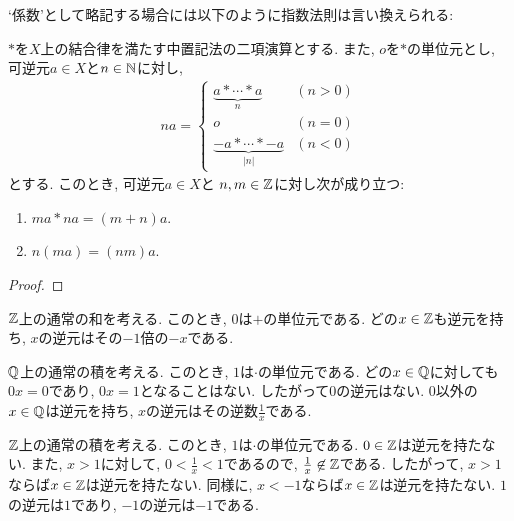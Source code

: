 `係数'として略記する場合には以下のように指数法則は言い換えられる:
\begin{prop}
  $\ast$を$X$上の結合律を満たす中置記法の二項演算とする.
  また, $o$を$\ast$の単位元とし,
  可逆元$a\in X$と$n\in\mathbb{N}$に対し,
  \begin{align*}
    na=
    \begin{cases}
      \underbrace{a\ast \cdots \ast a}_{n} & (n>0)\\
      o & (n=0)\\
      \underbrace{-a\ast \cdots \ast -a}_{|n|} & (n<0)
    \end{cases}
  \end{align*}
  とする.
  このとき,
  可逆元$a\in X$と
  $n,m\in\mathbb{Z}$に対し次が成り立つ:
  \begin{enumerate}
    \item $ma\ast na=(m+n)a$.
    \item $n(ma)=(nm)a$.
  \end{enumerate}
\end{prop}
\begin{proof}\end{proof}


\begin{example}
  $\mathbb{Z}$上の通常の和を考える.
  このとき, $0$は$+$の単位元である.
  どの$x\in \mathbb{Z}$も逆元を持ち,
  $x$の逆元はその$-1$倍の$-x$である.
\end{example}
\begin{example}
  $\mathbb{Q}$上の通常の積を考える.
  このとき, $1$は$\cdot$の単位元である.
  どの$x\in\mathbb{Q}$に対しても$0x=0$であり,
  $0x=1$となることはない.
  したがって$0$の逆元はない.
  $0$以外の$x\in \mathbb{Q}$は逆元を持ち,
  $x$の逆元はその逆数$\frac{1}{x}$である.
\end{example}
\begin{example}
  $\mathbb{Z}$上の通常の積を考える.
  このとき, $1$は$\cdot$の単位元である.
  $0\in\mathbb{Z}$は逆元を持たない.
  また, $x>1$に対して,
  $0<\frac{1}{x}<1$であるので,
  $\frac{1}{x}\not\in \mathbb{Z}$である.
  したがって, $x>1$ならば$x\in\mathbb{Z}$は逆元を持たない.
  同様に, $x<-1$ならば$x\in \mathbb{Z}$は逆元を持たない.
  $1$の逆元は$1$であり,
  $-1$の逆元は$-1$である.
\end{example}

